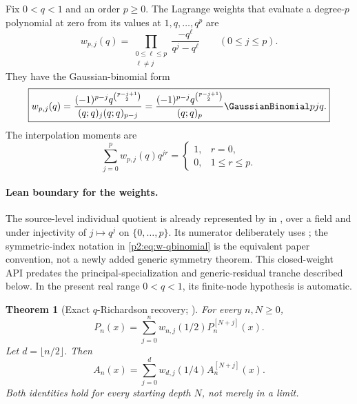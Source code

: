 \documentclass[11pt,oneside]{article}
\numberwithin{equation}{section}
\newtheorem{theorem}{Theorem}[section]
\theoremstyle{definition}
\theoremstyle{remark}
\begin{document}
Fix $0<q<1$ and an order $p\ge0$.  The Lagrange weights that evaluate a degree-$p$ polynomial at
zero from its values at $1,q,\ldots,q^p$ are
\begin{equation}
 w_{p,j}(q)
 =\prod_{\substack{0\le\ell\le p\\\ell\ne j}}
 \frac{-q^\ell}{q^j-q^\ell}
 \qquad(0\le j\le p).
 \label{p2:eq:w-Lagrange}
\end{equation}
They have the Gaussian-binomial form
\begin{equation}
 \boxed{
 w_{p,j}(q)
 =\frac{(-1)^{p-j}q^{\binom{p-j+1}{2}}}
 {(q;q)_j(q;q)_{p-j}}
 =\frac{(-1)^{p-j}q^{\binom{p-j+1}{2}}}{(q;q)_p}
 \GaussianBinomial pj q.
 }
 \label{p2:eq:w-qbinomial}
\end{equation}
The interpolation moments are
\begin{equation}
 \sum_{j=0}^{p}w_{p,j}(q)q^{jr}
 =\begin{cases}
 1,&r=0,\\
 0,&1\le r\le p.
 \end{cases}
 \label{p2:eq:w-annihilation}
\end{equation}

\paragraph{Lean boundary for the weights.}
The source-level individual quotient is already represented by
 in
, over a field and under injectivity of
\(j\mapsto q^j\) on \(\{0,\ldots,p\}\).  Its numerator deliberately uses
; the symmetric-index notation in
\eqref{p2:eq:w-qbinomial} is the equivalent paper convention, not a newly added
generic symmetry theorem.  This closed-weight API predates the
principal-specialization and generic-residual tranche described below.  In the
present real range \(0<q<1\), its finite-node hypothesis is automatic.

\begin{theorem}[Exact $q$-Richardson recovery; \statusnew]
\label{p2:thm:exact-recovery}
For every $n,N\ge0$,
\begin{equation}
 \boxed{
 P_n(x)=\sum_{j=0}^{n}w_{n,j}(1/2)P_n^{[N+j]}(x).
 }
 \label{p2:eq:P-exact-recovery}
\end{equation}
Let $d=\lfloor n/2\rfloor$.  Then
\begin{equation}
 \boxed{
 A_n(x)=\sum_{j=0}^{d}w_{d,j}(1/4)A_n^{[N+j]}(x).
 }
 \label{p2:eq:A-exact-recovery}
\end{equation}
Both identities hold for every starting depth $N$, not merely in a limit.
\end{theorem}
\end{document}
